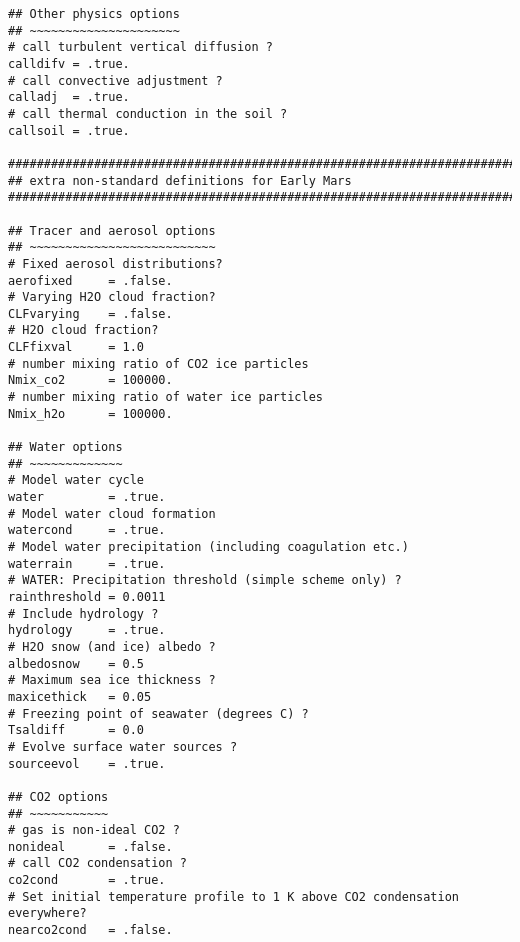 {\begin{verbatim}
## Other physics options
## ~~~~~~~~~~~~~~~~~~~~~
# call turbulent vertical diffusion ?
calldifv = .true.
# call convective adjustment ?
calladj  = .true.
# call thermal conduction in the soil ?
callsoil = .true.

#########################################################################
## extra non-standard definitions for Early Mars
#########################################################################

## Tracer and aerosol options
## ~~~~~~~~~~~~~~~~~~~~~~~~~~
# Fixed aerosol distributions?
aerofixed     = .false.
# Varying H2O cloud fraction?
CLFvarying    = .false.
# H2O cloud fraction?
CLFfixval     = 1.0
# number mixing ratio of CO2 ice particles
Nmix_co2      = 100000.
# number mixing ratio of water ice particles
Nmix_h2o      = 100000.

## Water options
## ~~~~~~~~~~~~~
# Model water cycle
water         = .true.
# Model water cloud formation
watercond     = .true.
# Model water precipitation (including coagulation etc.)
waterrain     = .true.
# WATER: Precipitation threshold (simple scheme only) ?
rainthreshold = 0.0011
# Include hydrology ?
hydrology     = .true.
# H2O snow (and ice) albedo ?
albedosnow    = 0.5
# Maximum sea ice thickness ?
maxicethick   = 0.05
# Freezing point of seawater (degrees C) ?
Tsaldiff      = 0.0
# Evolve surface water sources ?
sourceevol    = .true.

## CO2 options
## ~~~~~~~~~~~
# gas is non-ideal CO2 ?
nonideal      = .false.
# call CO2 condensation ?
co2cond       = .true.
# Set initial temperature profile to 1 K above CO2 condensation everywhere?
nearco2cond   = .false.
\end{verbatim}
}

